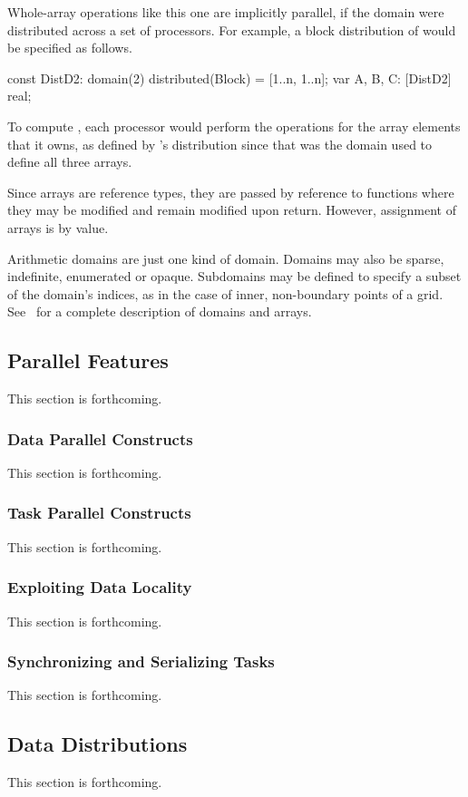 Whole-array operations like this one are implicitly parallel, if the 
domain were distributed across a set of processors.  For example, 
a block distribution of  would be specified as follows.    
\begin{chapel}
const DistD2: domain(2) distributed(Block) = [1..n, 1..n];
var A, B, C: [DistD2] real;
\end{chapel}
To compute , each processor would perform the 
operations for the array elements that it owns, 
as defined by 's distribution since that was the domain
used to define all three arrays.

Since arrays are reference types, they are passed by reference to functions
where they may be modified and remain modified upon return.  However, assignment
of arrays is by value.

Arithmetic domains are just one kind of domain.  Domains may
also be sparse, indefinite, enumerated or opaque.  Subdomains may be
defined to specify a subset of the domain's indices, as in the case of
inner, non-boundary points of a grid.  See~ for
a complete description of domains and arrays.
 
\subsection{Parallel Features}
\label{Parallel_Features}

This section is forthcoming.


\subsubsection{Data Parallel Constructs}
\label{Data_Parallel_Constructs}

This section is forthcoming.


\subsubsection{Task Parallel Constructs}
\label{Task_Parallel_Constructs}

This section is forthcoming.


\subsubsection{Exploiting Data Locality}
\label{Exploiting_Data_Locality}

This section is forthcoming.


\subsubsection{Synchronizing and Serializing Tasks}
\label{Synchronizing_and_Serializing_Tasks}

This section is forthcoming.


\subsection{Data Distributions}
\label{Data_Distributions}

This section is forthcoming.


